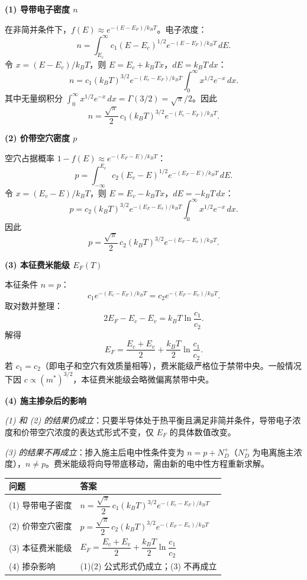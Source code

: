\begin{derivationbox}[标准解题过程]
\textbf{(1) 导带电子密度 $n$}

在非简并条件下，$f(E)\approx e^{-(E-E_F)/k_BT}$。电子浓度：
\[
n=\int_{E_c}^\infty c_1(E-E_c)^{1/2}e^{-(E-E_F)/k_BT}\,dE.
\]
令 $x=(E-E_c)/k_BT$，则 $E=E_c+k_BTx$，$dE=k_BT\,dx$：
\[
n=c_1(k_BT)^{3/2}e^{-(E_c-E_F)/k_BT}\int_0^\infty x^{1/2}e^{-x}\,dx.
\]
其中无量纲积分 $\int_0^\infty x^{1/2}e^{-x}\,dx=\Gamma(3/2)=\sqrt{\pi}/2$。因此
\begin{equation}
\boxed{n=\frac{\sqrt{\pi}}{2}\,c_1(k_BT)^{3/2}e^{-(E_c-E_F)/k_BT}.}
\end{equation}

\textbf{(2) 价带空穴密度 $p$}

空穴占据概率 $1-f(E)\approx e^{-(E_F-E)/k_BT}$：
\[
p=\int_{-\infty}^{E_v}c_2(E_v-E)^{1/2}e^{-(E_F-E)/k_BT}\,dE.
\]
令 $x=(E_v-E)/k_BT$，则 $E=E_v-k_BTx$，$dE=-k_BT\,dx$：
\[
p=c_2(k_BT)^{3/2}e^{-(E_F-E_v)/k_BT}\int_0^\infty x^{1/2}e^{-x}\,dx.
\]
因此
\begin{equation}
\boxed{p=\frac{\sqrt{\pi}}{2}\,c_2(k_BT)^{3/2}e^{-(E_F-E_v)/k_BT}.}
\end{equation}

\textbf{(3) 本征费米能级 $E_F(T)$}

本征条件 $n=p$：
\[
c_1e^{-(E_c-E_F)/k_BT}=c_2e^{-(E_F-E_v)/k_BT}.
\]
取对数并整理：
\[
2E_F-E_c-E_v=k_BT\ln\frac{c_1}{c_2}.
\]
解得
\begin{equation}
\boxed{E_F=\frac{E_c+E_v}{2}+\frac{k_BT}{2}\ln\frac{c_1}{c_2}.}
\end{equation}
若 $c_1=c_2$（即电子和空穴有效质量相等），费米能级严格位于禁带中央。一般情况下因 $c\propto(m^*)^{3/2}$，本征费米能级会略微偏离禁带中央。

\textbf{(4) 施主掺杂后的影响}

\textit{(1) 和 (2) 的结果仍成立}：只要半导体处于热平衡且满足非简并条件，导带电子浓度和价带空穴浓度的表达式形式不变，仅 $E_F$ 的具体数值改变。

\textit{(3) 的结果不再成立}：掺入施主后电中性条件变为 $n=p+N_D^+$（$N_D^+$ 为电离施主浓度），$n\neq p$。费米能级将向导带底移动，需由新的电中性方程重新求解。
\end{derivationbox}

\begin{formulabox}[答案汇总]
\begin{center}
\begin{tabular}{ll}
\toprule
\textbf{问题} & \textbf{答案} \\
\midrule
(1) 导带电子密度 & $n=\dfrac{\sqrt{\pi}}{2}\,c_1(k_BT)^{3/2}e^{-(E_c-E_F)/k_BT}$ \\
(2) 价带空穴密度 & $p=\dfrac{\sqrt{\pi}}{2}\,c_2(k_BT)^{3/2}e^{-(E_F-E_v)/k_BT}$ \\
(3) 本征费米能级 & $E_F=\dfrac{E_c+E_v}{2}+\dfrac{k_BT}{2}\ln\dfrac{c_1}{c_2}$ \\
(4) 掺杂影响 & (1)(2) 公式形式仍成立；(3) 不再成立 \\
\bottomrule
\end{tabular}
\end{center}
\end{formulabox}

